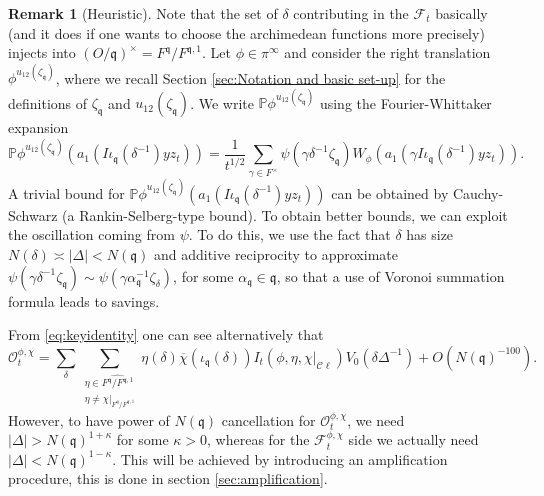 \documentclass[a4paper,11pt]{amsart}
\theoremstyle{definition}
\newtheorem{remark}[theorem]{Remark}
\newcommand{\cl}{\mathcal{C}\ell}
\begin{document}
\begin{remark}[Heuristic]\label{rmk:heuristic}Note that the set of $\delta$ contributing in the $\mathcal{F}_t$ basically (and it does if one wants to choose the archimedean functions more precisely) injects  into $(O/\mathfrak{q})^{\times} = F^{\mathfrak{q}}/F^{\mathfrak{q},1}$. Let $\phi \in \pi^\infty$ and consider the right translation $\phi^{u_{12}(\zeta_\mathfrak{q})}$, where we recall Section \ref{sec:Notation and basic set-up} for the definitions of $\zeta_\mathfrak{q}$ and $u_{12}(\zeta_\mathfrak{q})$. We write $\mathbb{P}\phi^{u_{12}(\zeta_\mathfrak{q})}$ using the Fourier-Whittaker expansion  
\[\mathbb{P}\phi^{u_{12}(\zeta_\mathfrak{q})}(a_1(I\iota_\mathfrak{q}(\delta^{-1})yz_t)) = \frac{1}{t^{1/2}}\sum_{\gamma \in F^\times}\psi(\gamma\delta^{-1}\zeta_{\mathfrak{q}})W_{\phi}(a_1(\gamma I\iota_\mathfrak{q}(\delta^{-1})yz_t)). \]
A trivial bound for $\mathbb{P}\phi^{u_{12}(\zeta_\mathfrak{q})}(a_1(I\iota_\mathfrak{q}(\delta^{-1})yz_t))$ can be obtained by Cauchy-Schwarz (a Rankin-Selberg-type bound). To obtain better bounds, we can exploit the oscillation coming from $\psi$. To do this, we use the fact that $\delta$ has size $N(\delta) \asymp \vert\Delta\vert < N(\mathfrak{q})$ and additive reciprocity to approximate $\psi(\gamma\delta^{-1}\zeta_\mathfrak{q})\sim \psi(\gamma\alpha_\mathfrak{q}^{-1}\zeta_\delta)$, for some $\alpha_\mathfrak{q} \in \mathfrak{q}$, so that a use of Voronoi summation formula leads to savings.

From \eqref{eq:keyidentity} one can see alternatively that
\[\mathcal{O}_t^{\phi,\chi} = \sum_{\delta}\sum_{\substack{\eta\in \widehat{F^\mathfrak{q}/F^{\mathfrak{q},1}}\\\eta\neq \chi|_{F^{\mathfrak{q}}/F^{\mathfrak{q},1}}}}\eta(\delta)\overline{\chi}(\iota_\mathfrak{q}(\delta))I_t(\phi,\eta,\chi|_{\cl})V_0(\delta\Delta^{-1})+O(N(\mathfrak{q})^{-100}).\]
However, to have power of $N(\mathfrak{q})$ cancellation for $\mathcal O_t^{\phi,\chi}$, we need $\vert \Delta \vert > N(\mathfrak{q})^{1+\kappa}$ for some $\kappa>0$, whereas for the $\mathcal{F}_{t}^{\phi,\chi}$ side we actually need $\vert{\Delta}\vert < N(\mathfrak{q})^{1-\kappa}$. This will be achieved by introducing an amplification procedure, this is done in section \ref{sec:amplification}.

\end{remark}
\end{document}
